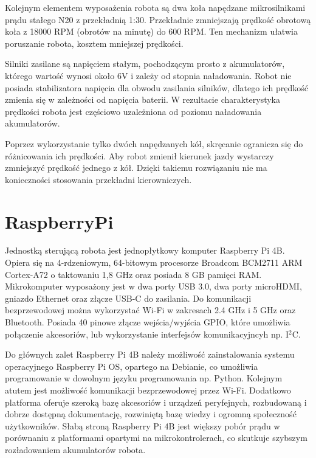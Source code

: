 Kolejnym elementem wyposażenia robota są dwa koła napędzane mikrosilnikami prądu stałego N20 z przekładnią 1:30. Przekładnie zmniejszają prędkość obrotową koła z 18000 RPM (obrotów na minutę) do 600 RPM. Ten mechanizm ułatwia poruszanie robota, kosztem mniejszej prędkości. 

Silniki zasilane są napięciem stałym, pochodzącym prosto z akumulatorów, którego wartość wynosi około 6V i zależy od stopnia naładowania. Robot nie posiada stabilizatora napięcia dla obwodu zasilania silników, dlatego ich prędkość zmienia się w zależności od napięcia baterii. W rezultacie charakterystyka prędkości robota jest częściowo uzależniona od poziomu naładowania akumulatorów.

Poprzez wykorzystanie tylko dwóch napędzanych kół, skręcanie ogranicza się do różnicowania ich prędkości. Aby robot zmienił kierunek jazdy wystarczy zmniejszyć prędkość jednego z kół. Dzięki takiemu rozwiązaniu nie ma konieczności stosowania przekładni kierowniczych.


\section{RaspberryPi}
\label{sec:raspberryPi}

Jednostką sterującą robota jest jednopłytkowy komputer Raspberry Pi 4B. Opiera się na 4-rdzeniowym, 64-bitowym procesorze Broadcom BCM2711 ARM Cortex-A72 o taktowaniu 1,8 GHz oraz posiada 8 GB pamięci RAM. Mikrokomputer wyposażony jest w dwa porty USB 3.0, dwa porty microHDMI, gniazdo Ethernet oraz złącze USB-C do zasilania. Do komunikacji bezprzewodowej można wykorzystać Wi-Fi w zakresach 2.4 GHz i 5 GHz oraz Bluetooth. Posiada 40 pinowe złącze wejścia/wyjścia GPIO, które umożliwia połączenie akcesoriów, lub wykorzystanie interfejsów komunikacyjncyh np. I$^2$C.

Do głównych zalet Raspberry Pi 4B należy możliwość zainstalowania systemu operacyjnego Raspberry Pi OS, opartego na Debianie, co umożliwia programowanie w dowolnym języku programowania np. Python. Kolejnym atutem jest możliwość komunikacji bezprzewodowej przez Wi-Fi. Dodatkowo platforma oferuje szeroką bazę akcesoriów i urządzeń peryfejnych, rozbudowaną i dobrze dostępną dokumentację, rozwiniętą bazę wiedzy i ogromną społeczność użytkowników. Słabą stroną Raspberry Pi 4B jest większy pobór prądu w porównaniu z platformami opartymi na  mikrokontrolerach, co skutkuje szybszym rozładowaniem akumulatorów robota.


